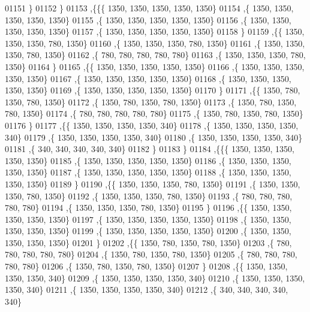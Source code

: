 \begin{DoxyCode}
01151    \}
01152   \}
01153  ,\{\{\{  1350,  1350,  1350,  1350,  1350\}
01154    ,\{  1350,  1350,  1350,  1350,  1350\}
01155    ,\{  1350,  1350,  1350,  1350,  1350\}
01156    ,\{  1350,  1350,  1350,  1350,  1350\}
01157    ,\{  1350,  1350,  1350,  1350,  1350\}
01158    \}
01159   ,\{\{  1350,  1350,  1350,   780,  1350\}
01160    ,\{  1350,  1350,  1350,   780,  1350\}
01161    ,\{  1350,  1350,  1350,   780,  1350\}
01162    ,\{   780,   780,   780,   780,   780\}
01163    ,\{  1350,  1350,  1350,   780,  1350\}
01164    \}
01165   ,\{\{  1350,  1350,  1350,  1350,  1350\}
01166    ,\{  1350,  1350,  1350,  1350,  1350\}
01167    ,\{  1350,  1350,  1350,  1350,  1350\}
01168    ,\{  1350,  1350,  1350,  1350,  1350\}
01169    ,\{  1350,  1350,  1350,  1350,  1350\}
01170    \}
01171   ,\{\{  1350,   780,  1350,   780,  1350\}
01172    ,\{  1350,   780,  1350,   780,  1350\}
01173    ,\{  1350,   780,  1350,   780,  1350\}
01174    ,\{   780,   780,   780,   780,   780\}
01175    ,\{  1350,   780,  1350,   780,  1350\}
01176    \}
01177   ,\{\{  1350,  1350,  1350,  1350,   340\}
01178    ,\{  1350,  1350,  1350,  1350,   340\}
01179    ,\{  1350,  1350,  1350,  1350,   340\}
01180    ,\{  1350,  1350,  1350,  1350,   340\}
01181    ,\{   340,   340,   340,   340,   340\}
01182    \}
01183   \}
01184  ,\{\{\{  1350,  1350,  1350,  1350,  1350\}
01185    ,\{  1350,  1350,  1350,  1350,  1350\}
01186    ,\{  1350,  1350,  1350,  1350,  1350\}
01187    ,\{  1350,  1350,  1350,  1350,  1350\}
01188    ,\{  1350,  1350,  1350,  1350,  1350\}
01189    \}
01190   ,\{\{  1350,  1350,  1350,   780,  1350\}
01191    ,\{  1350,  1350,  1350,   780,  1350\}
01192    ,\{  1350,  1350,  1350,   780,  1350\}
01193    ,\{   780,   780,   780,   780,   780\}
01194    ,\{  1350,  1350,  1350,   780,  1350\}
01195    \}
01196   ,\{\{  1350,  1350,  1350,  1350,  1350\}
01197    ,\{  1350,  1350,  1350,  1350,  1350\}
01198    ,\{  1350,  1350,  1350,  1350,  1350\}
01199    ,\{  1350,  1350,  1350,  1350,  1350\}
01200    ,\{  1350,  1350,  1350,  1350,  1350\}
01201    \}
01202   ,\{\{  1350,   780,  1350,   780,  1350\}
01203    ,\{   780,   780,   780,   780,   780\}
01204    ,\{  1350,   780,  1350,   780,  1350\}
01205    ,\{   780,   780,   780,   780,   780\}
01206    ,\{  1350,   780,  1350,   780,  1350\}
01207    \}
01208   ,\{\{  1350,  1350,  1350,  1350,   340\}
01209    ,\{  1350,  1350,  1350,  1350,   340\}
01210    ,\{  1350,  1350,  1350,  1350,   340\}
01211    ,\{  1350,  1350,  1350,  1350,   340\}
01212    ,\{   340,   340,   340,   340,   340\}

\end{DoxyCode}
